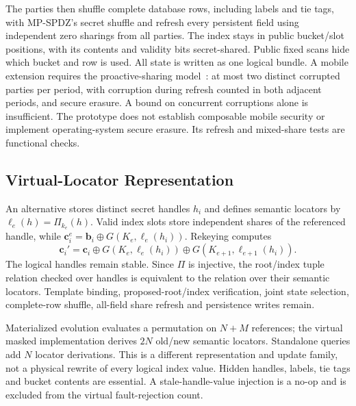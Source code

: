 \documentclass[journal]{IEEEtran}
\begin{document}
The parties then shuffle complete database rows, including labels and tie tags, with MP-SPDZ's secret shuffle and refresh every persistent field using independent zero sharings from all parties. The index stays in public bucket/slot positions, with its contents and validity bits secret-shared. Public fixed scans hide which bucket and row is used. All state is written as one logical bundle. A mobile extension requires the proactive-sharing model~\cite{herzberg1995proactive}: at most two distinct corrupted parties per period, with corruption during refresh counted in both adjacent periods, and secure erasure. A bound on concurrent corruptions alone is insufficient. The prototype does not establish composable mobile security or implement operating-system secure erasure. Its refresh and mixed-share tests are functional checks.

\subsection{Virtual-Locator Representation}
An alternative stores distinct secret handles $h_i$ and defines semantic locators by $\ell_e(h)=\Pi_{k_e}(h)$. Valid index slots store independent shares of the referenced handle, while $\mathbf c_i^e=\mathbf b_i\oplus G(K_e,\ell_e(h_i))$. Rekeying computes
\[
\mathbf c_i'=\mathbf c_i\oplus G(K_e,\ell_e(h_i))\oplus G(K_{e+1},\ell_{e+1}(h_i)).
\]
The logical handles remain stable. Since $\Pi$ is injective, the root/index tuple relation checked over handles is equivalent to the relation over their semantic locators. Template binding, proposed-root/index verification, joint state selection, complete-row shuffle, all-field share refresh and persistence writes remain.

Materialized evolution evaluates a permutation on $N+M$ references; the virtual masked implementation derives $2N$ old/new semantic locators. Standalone queries add $N$ locator derivations. This is a different representation and update family, not a physical rewrite of every logical index value. Hidden handles, labels, tie tags and bucket contents are essential. A stale-handle-value injection is a no-op and is excluded from the virtual fault-rejection count.
\end{document}
